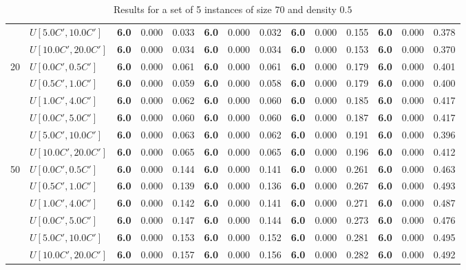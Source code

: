 \begin{table}[h]
{\begin{tabular}{|l|l||l|l|l||l|l|l||l|l|l||l|l|l|}
       & $U[5.0C',10.0C']$ & \textbf{6.0} & 0.000 & 0.033 & \textbf{6.0} & 0.000 & 0.032 & \textbf{6.0} & 0.000 & 0.155 & \textbf{6.0} & 0.000 & 0.378 \\
       & $U[10.0C',20.0C']$ & \textbf{6.0} & 0.000 & 0.034 & \textbf{6.0} & 0.000 & 0.034 & \textbf{6.0} & 0.000 & 0.153 & \textbf{6.0} & 0.000 & 0.370 \\
      \hline\hline
      \multirow{6}{*}{20} & $U[0.0C',0.5C']$ & \textbf{6.0} & 0.000 & 0.061 & \textbf{6.0} & 0.000 & 0.061 & \textbf{6.0} & 0.000 & 0.179 & \textbf{6.0} & 0.000 & 0.401 \\
       & $U[0.5C',1.0C']$ & \textbf{6.0} & 0.000 & 0.059 & \textbf{6.0} & 0.000 & 0.058 & \textbf{6.0} & 0.000 & 0.179 & \textbf{6.0} & 0.000 & 0.400 \\
       & $U[1.0C',4.0C']$ & \textbf{6.0} & 0.000 & 0.062 & \textbf{6.0} & 0.000 & 0.060 & \textbf{6.0} & 0.000 & 0.185 & \textbf{6.0} & 0.000 & 0.417 \\
       & $U[0.0C',5.0C']$ & \textbf{6.0} & 0.000 & 0.060 & \textbf{6.0} & 0.000 & 0.060 & \textbf{6.0} & 0.000 & 0.187 & \textbf{6.0} & 0.000 & 0.417 \\
       & $U[5.0C',10.0C']$ & \textbf{6.0} & 0.000 & 0.063 & \textbf{6.0} & 0.000 & 0.062 & \textbf{6.0} & 0.000 & 0.191 & \textbf{6.0} & 0.000 & 0.396 \\
       & $U[10.0C',20.0C']$ & \textbf{6.0} & 0.000 & 0.065 & \textbf{6.0} & 0.000 & 0.065 & \textbf{6.0} & 0.000 & 0.196 & \textbf{6.0} & 0.000 & 0.412 \\
      \hline\hline
      \multirow{6}{*}{50} & $U[0.0C',0.5C']$ & \textbf{6.0} & 0.000 & 0.144 & \textbf{6.0} & 0.000 & 0.141 & \textbf{6.0} & 0.000 & 0.261 & \textbf{6.0} & 0.000 & 0.463 \\
       & $U[0.5C',1.0C']$ & \textbf{6.0} & 0.000 & 0.139 & \textbf{6.0} & 0.000 & 0.136 & \textbf{6.0} & 0.000 & 0.267 & \textbf{6.0} & 0.000 & 0.493 \\
       & $U[1.0C',4.0C']$ & \textbf{6.0} & 0.000 & 0.142 & \textbf{6.0} & 0.000 & 0.141 & \textbf{6.0} & 0.000 & 0.271 & \textbf{6.0} & 0.000 & 0.487 \\
       & $U[0.0C',5.0C']$ & \textbf{6.0} & 0.000 & 0.147 & \textbf{6.0} & 0.000 & 0.144 & \textbf{6.0} & 0.000 & 0.273 & \textbf{6.0} & 0.000 & 0.476 \\
       & $U[5.0C',10.0C']$ & \textbf{6.0} & 0.000 & 0.153 & \textbf{6.0} & 0.000 & 0.152 & \textbf{6.0} & 0.000 & 0.281 & \textbf{6.0} & 0.000 & 0.495 \\
       & $U[10.0C',20.0C']$ & \textbf{6.0} & 0.000 & 0.157 & \textbf{6.0} & 0.000 & 0.156 & \textbf{6.0} & 0.000 & 0.282 & \textbf{6.0} & 0.000 & 0.492 \\
      \hline
      \end{tabular}
      }
      \caption{Results for a set of 5 instances of size $70$ and density $0.5$}
      \label{tab:pcpn70}\end{table}


